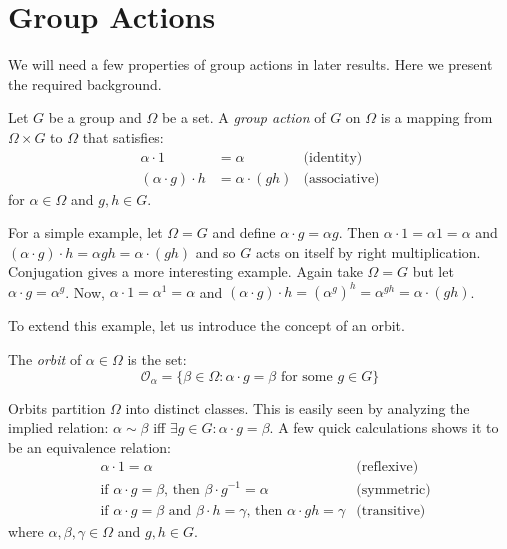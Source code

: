 \documentclass[main.tex]{subfiles}
\begin{document}
\section{Group Actions}

We will need a few properties of group actions in later results. Here we present the required background.

\begin{definition}
Let $G$ be a group and $\Omega$ be a set. A \emph{group action} of $G$ on $\Omega$ is a mapping from $\Omega \times G$ to $\Omega$ that satisfies:
\begin{align*}
\alpha \cdot 1 &= \alpha &\text{(identity)} \\
(\alpha \cdot g) \cdot h &= \alpha \cdot (gh) &\text{(associative)}
\end{align*}
for $\alpha \in \Omega$ and $g, h \in G$.
\end{definition}

For a simple example, let $\Omega = G$ and define $\alpha \cdot g = \alpha g$. Then $\alpha \cdot 1 = \alpha 1 = \alpha$ and $(\alpha \cdot g) \cdot h = \alpha g h = \alpha \cdot (gh)$ and so $G$ acts on itself by right multiplication. Conjugation gives a more interesting example. Again take $\Omega = G$ but let $\alpha \cdot g = \alpha^g$. Now, $\alpha \cdot 1 = \alpha^1 = \alpha$ and $(\alpha \cdot g) \cdot h = (\alpha^g)^h = \alpha^{gh} = \alpha \cdot (gh)$.

To extend this example, let us introduce the concept of an orbit.

\begin{definition}
The \emph{orbit} of $\alpha \in \Omega$ is the set:
$$\mathcal{O}_\alpha = \{ \beta \in \Omega : \alpha \cdot g = \beta \text{ for some } g \in G \}$$
\end{definition}

Orbits partition $\Omega$ into distinct classes. This is easily seen by analyzing the implied relation: $\alpha \sim \beta$ iff $\exists g \in G : \alpha \cdot g = \beta$. A few quick calculations shows it to be an equivalence relation:
\begin{align*}
&\alpha \cdot 1 = \alpha &\text{(reflexive)} \\
&\text{if } \alpha \cdot g = \beta \text{, then } \beta \cdot g^{-1} = \alpha &\text{(symmetric)} \\
&\text{if } \alpha \cdot g = \beta \text{ and } \beta \cdot h = \gamma \text{, then } \alpha \cdot gh = \gamma  &\text{(transitive)}
\end{align*}
where $\alpha, \beta, \gamma \in \Omega$ and $g, h \in G$.
\end{document}
